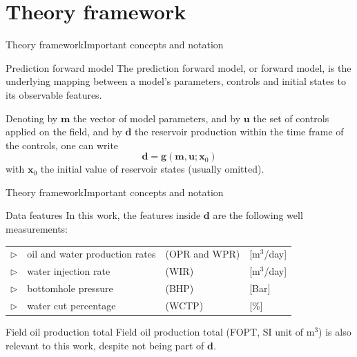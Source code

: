 \section{Theory framework}

\begin{frame}{Theory framework}{Important concepts and notation}
    \begin{block}{Prediction forward model}
        The prediction forward model, or forward model, 
        is the underlying mapping between a  model's parameters, controls and initial states to its observable features.
    \end{block}
    \vfill
    Denoting by $\mathbf{m}$ the vector of model parameters,
    and by $\mathbf{u}$ the set of controls applied on the field,
    and by $\mathbf{d}$ the reservoir production within the time frame of the controls,
    one can write
    \begin{equation}
        \mathbf{d} = \mathbf{g}(\mathbf{m}, \mathbf{u}; \mathbf{x}_0)
    \label{eq:prediction-forward-model}
    \end{equation} 
    with $\mathbf{x}_0$ the initial value of reservoir states (usually omitted).
    \vfill
\end{frame}

\begin{frame}{Theory framework}{Important concepts and notation}
    \begin{exampleblock}{Data features}
        In this work, the features inside $\mathbf{d}$ are the following well measurements:

        \medskip 

        \def\arraystretch{1.5}
        \begin{tabular}{r l l l}
            $\triangleright$ & oil and water production rates & (OPR and WPR) & [m$^3$/day] \\
            $\triangleright$ & water injection rate           & (WIR)         & [m$^3$/day] \\
            $\triangleright$ & bottomhole pressure            & (BHP)         & [Bar]       \\
            $\triangleright$ & water cut percentage           & (WCTP)        & [\%]
        \end{tabular}
    \end{exampleblock}
    \vfill 
    \begin{alertblock}{Field oil production total}
        Field oil production total (FOPT, SI unit of m$^3$)
        is also relevant to this work, despite not being part of $\mathbf{d}$.
    \end{alertblock}
\end{frame}

